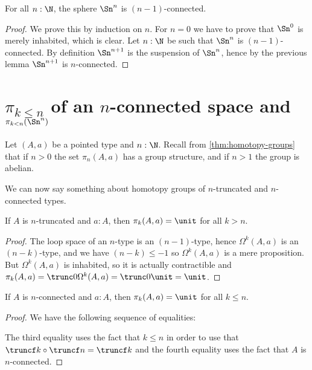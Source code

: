 \begin{cor} \label{cor:sn-connected}
  For all $n:\N$, the sphere $\Sn^n$ is $(n-1)$-connected.
\end{cor}

\begin{proof}
  We prove this by induction on $n$.
  For $n=0$ we have to prove that $\Sn^0$ is merely inhabited, which is clear.
  Let $n:\N$ be such that $\Sn^n$ is $(n-1)$-connected. By definition $\Sn^{n+1}$
  is the suspension of $\Sn^n$, hence by the previous lemma $\Sn^{n+1}$ is
  $n$-connected.
\end{proof}

\section{\texorpdfstring{$\pi_{k \le n}$}{π\_(k≤n)} of an \texorpdfstring{$n$}{n}-connected space and \texorpdfstring{$\pi_{k < n}(\Sn ^n)$}{π\_(k<n)(Sⁿ)}}
\label{sec:pik-le-n}

Let $(A,a)$ be a pointed type and $n:\N$.  Recall from
\cref{thm:homotopy-groups} that if $n>0$ the set $\pi_n(A,a)$ has a group
structure, and if $n>1$ the group is abelian.

We can now say something about homotopy groups of $n$-truncated and
$n$-connected types.

\begin{lem}
  If $A$ is $n$-truncated and $a:A$, then $\pi_k(A,a)=\unit$ for all $k>n$.
\end{lem}

\begin{proof}
  The loop space of an $n$-type  is an
  $(n-1)$-type, hence $\Omega^k(A,a)$ is an $(n-k)$-type, and we have
  $(n-k)\le-1$ so $\Omega^k(A,a)$ is a mere proposition. But $\Omega^k(A,a)$ is inhabited,
  so it is actually contractible and
  $\pi_k(A,a)=\trunc0{\Omega^k(A,a)}=\trunc0{\unit}=\unit$.
\end{proof}

\begin{lem} \label{lem:pik-nconnected}
  If $A$ is $n$-connected and $a:A$, then $\pi_k(A,a)=\unit$ for all $k\le{}n$.
\end{lem}

\begin{proof}
  We have the following sequence of equalities:
  The third equality uses the fact that $k\le{}n$ in order to use that
  $\truncf k\circ\truncf n=\truncf k$ and the fourth equality uses the fact that $A$ is
  $n$-connected.
\end{proof}

